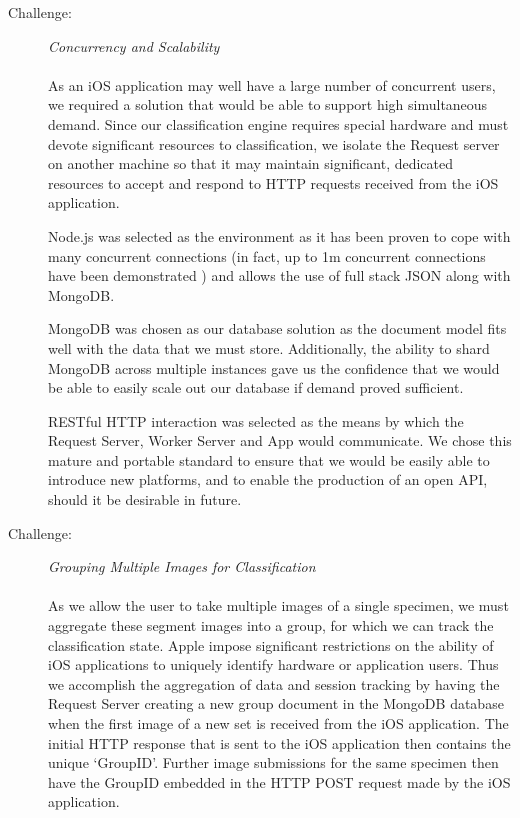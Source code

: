 \documentclass[a4paper,11pt]{article}
\begin{document}
\begin{description}

\item [Challenge:] \textit{Concurrency and Scalability}\\\\
As an iOS application may well have a large number of concurrent users, we required a solution that would be able to support high simultaneous demand. Since our classification engine requires special hardware and must devote significant resources to classification, we isolate the Request server on another machine so that it may maintain significant, dedicated resources to accept and respond to HTTP requests received from the iOS application.

\hspace{5 mm} Node.js was selected as the environment as it has been proven to cope with many concurrent connections (in fact, up to 1m concurrent connections have been demonstrated \cite{nodeload}) and allows the use of full stack JSON along with MongoDB. 

\hspace{5 mm} MongoDB was chosen as our database solution as the document model fits well with the data that we must store. Additionally, the ability to shard MongoDB across multiple instances gave us the confidence that we would be able to easily scale out our database if demand proved sufficient.

\hspace{5 mm} RESTful HTTP interaction was selected as the means by which the Request Server, Worker Server and App would communicate. We chose this mature and portable standard to ensure that we would be easily able to introduce new platforms, and to enable the production of an open API, should it be desirable in future. \\

\item [Challenge:] \textit{Grouping Multiple Images for Classification}\\\\
As we allow the user to take multiple images of a single specimen, we must aggregate these segment images into a group, for which we can track the classification state. Apple impose significant restrictions on the ability of iOS applications to uniquely identify hardware or application users. Thus we accomplish the aggregation of data and session tracking by having the Request Server creating a new group document in the MongoDB database when the first image of a new set is received from the iOS application. The initial HTTP response that is sent to the iOS application then contains the unique `GroupID'. Further image submissions for the same specimen then have the GroupID embedded in the HTTP POST request made by the iOS application.


\end{description}
\end{document}
